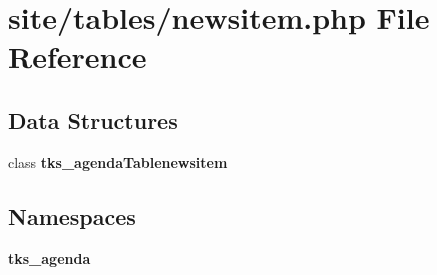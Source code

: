 \section{site/tables/newsitem.php File Reference}
\label{site_2tables_2newsitem_8php}
\subsection*{Data Structures}
\begin{DoxyCompactItemize}
\item 
class \textbf{ tks\+\_\+agenda\+Tablenewsitem}
\end{DoxyCompactItemize}
\subsection*{Namespaces}
\begin{DoxyCompactItemize}
\item 
 \textbf{ tks\+\_\+agenda}
\end{DoxyCompactItemize}
